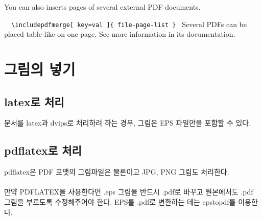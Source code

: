 	You can also inserts pages of several external PDF documents. \par
	\verb|	\includepdfmerge[ key=val ]{ file-page-list } |
	Several PDFs can be placed table-like on one page. See more information in its documentation.		
			
				
	
					
						
							
								
									
										
											
												
													
														
															
																
																	
																		
																			
																				
																					
																						
																							
																								
																									
																										
																											
																												
																													
																														
																															
																																
																																	
																																		
																																				

\newpage
\section{그림의 넣기}

\subsection{latex로 처리}

	
	문서를 latex과 dvips로 처리하려 하는 경우, 그림은 EPS 파일만을 포함할 수 있다. 

\subsection{pdflatex로 처리}


		pdflatex은 PDF 포맷의 그림파일은 물론이고 JPG, PNG 그림도 처리한다. \\ \\
		만약 PDFLATEX을 사용한다면 .eps 그림을 반드시 .pdf로 바꾸고 원본에서도 .pdf 그림을 
		부르도록 수정해주어야 한다. EPS를 .pdf로 변환하는 데는 epstopdf를 이용한다.
		

